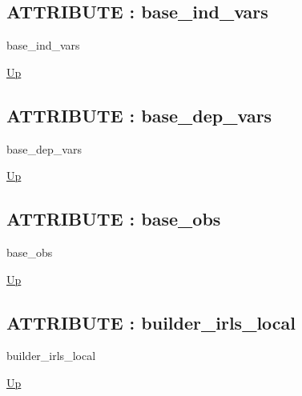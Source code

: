 \par
\par
\subsection*{ATTRIBUTE : base\_ind\_vars}
\hypertarget{ecldoc:logisticregression.constants.base_ind_vars}{}
\begin{minipage}[t]{\textwidth}
\begin{flushleft}
 base\_ind\_vars 
\end{flushleft}
\end{minipage}
\hyperlink{ecldoc:LogisticRegression.Constants}{Up}

\par
\par
\subsection*{ATTRIBUTE : base\_dep\_vars}
\hypertarget{ecldoc:logisticregression.constants.base_dep_vars}{}
\begin{minipage}[t]{\textwidth}
\begin{flushleft}
 base\_dep\_vars 
\end{flushleft}
\end{minipage}
\hyperlink{ecldoc:LogisticRegression.Constants}{Up}

\par
\par
\subsection*{ATTRIBUTE : base\_obs}
\hypertarget{ecldoc:logisticregression.constants.base_obs}{}
\begin{minipage}[t]{\textwidth}
\begin{flushleft}
 base\_obs 
\end{flushleft}
\end{minipage}
\hyperlink{ecldoc:LogisticRegression.Constants}{Up}

\par
\par
\subsection*{ATTRIBUTE : builder\_irls\_local}
\hypertarget{ecldoc:logisticregression.constants.builder_irls_local}{}
\begin{minipage}[t]{\textwidth}
\begin{flushleft}
 builder\_irls\_local 
\end{flushleft}
\end{minipage}
\hyperlink{ecldoc:LogisticRegression.Constants}{Up}

